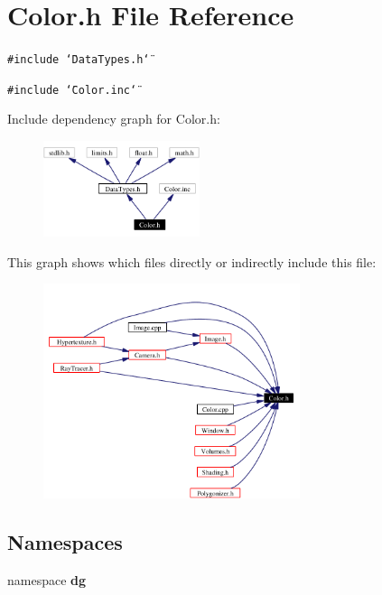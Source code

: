 \section{Color.h File Reference}
\label{Color_8h}
{\tt \#include \char`\"{}Data\-Types.h\char`\"{}}\par
{\tt \#include \char`\"{}Color.inc\char`\"{}}\par


Include dependency graph for Color.h:\begin{figure}[H]
\begin{center}
\leavevmode
\includegraphics[width=130pt]{Color_8h__incl}
\end{center}
\end{figure}


This graph shows which files directly or indirectly include this file:\begin{figure}[H]
\begin{center}
\leavevmode
\includegraphics[width=213pt]{Color_8h__dep__incl}
\end{center}
\end{figure}
\subsection*{Namespaces}
\begin{CompactItemize}
\item 
namespace {\bf dg}
\end{CompactItemize}
